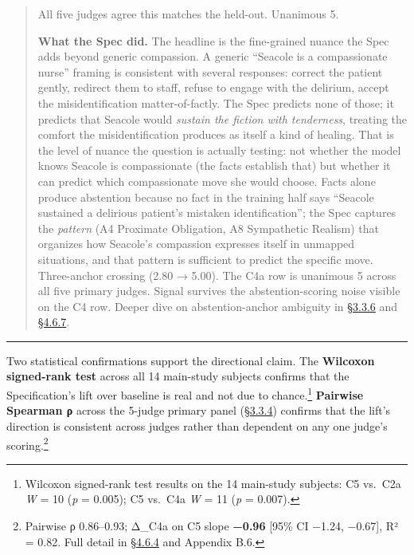 \begin{quote}
All five judges agree this matches the held-out. Unanimous 5.

\textbf{What the Spec did.} The headline is the fine-grained nuance the
Spec adds beyond generic compassion. A generic ``Seacole is a
compassionate nurse'' framing is consistent with several responses:
correct the patient gently, redirect them to staff, refuse to engage
with the delirium, accept the misidentification matter-of-factly. The
Spec predicts none of those; it predicts that Seacole would
\emph{sustain the fiction with tenderness}, treating the comfort the
misidentification produces as itself a kind of healing. That is the
level of nuance the question is actually testing: not whether the model
knows Seacole is compassionate (the facts establish that) but whether it
can predict which compassionate move she would choose. Facts alone
produce abstention because no fact in the training half says ``Seacole
sustained a delirious patient's mistaken identification''; the Spec
captures the \emph{pattern} (A4 Proximate Obligation, A8 Sympathetic
Realism) that organizes how Seacole's compassion expresses itself in
unmapped situations, and that pattern is sufficient to predict the
specific move. Three-anchor crossing (2.80 → 5.00). The C4a row is
unanimous 5 across all five primary judges. Signal survives the
abstention-scoring noise visible on the C4 row. Deeper dive on
abstention-anchor ambiguity in \hyperref[rubric-handling-limitations-post-hoc-validity-audit]{§3.3.6} and \hyperref[rubric-handling-limitations-post-hoc-validity-audit-1]{§4.6.7}.
\end{quote}

\begin{center}\rule{0.5\linewidth}{0.5pt}\end{center}

Two statistical confirmations support the directional claim. The
\textbf{Wilcoxon signed-rank test} across all 14 main-study subjects
confirms that the Specification's lift over baseline is real and not due
to chance.\footnote{Wilcoxon signed-rank test results on the 14
  main-study subjects: C5 vs.~C2a \emph{W} = 10 (\emph{p} = 0.005); C5
  vs.~C4a \emph{W} = 11 (\emph{p} = 0.007).} \textbf{Pairwise Spearman
ρ} across the 5-judge primary panel (\hyperref[inter-judge-agreement]{§3.3.4}) confirms that the lift's
direction is consistent across judges rather than dependent on any one
judge's scoring.\footnote{Pairwise ρ 0.86--0.93; Δ\_C4a on C5 slope
  \textbf{−0.96} {[}95\% CI −1.24, −0.67{]}, R² = 0.82. Full detail in
  \hyperref[statistical-rigor-checks-on-the-headline-gradient]{§4.6.4}
  and Appendix B.6.}

